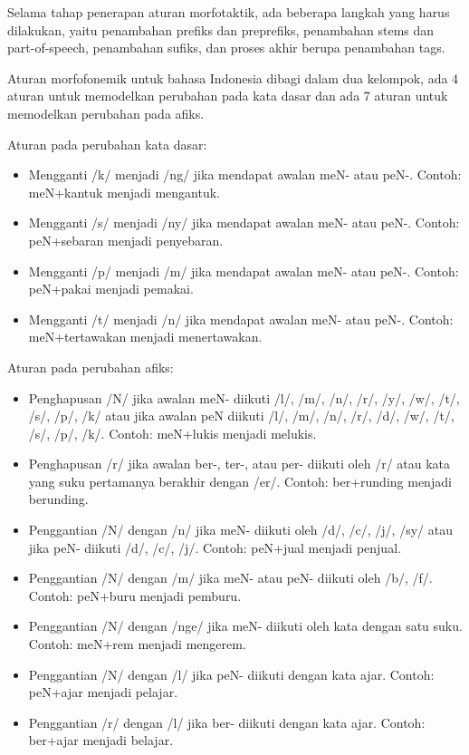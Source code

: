 Selama tahap penerapan aturan morfotaktik, ada beberapa langkah yang harus dilakukan, yaitu penambahan prefiks dan preprefiks, penambahan stems dan part-of-speech, penambahan sufiks, dan proses akhir berupa penambahan tags.

Aturan morfofonemik untuk bahasa Indonesia dibagi dalam dua kelompok, ada 4 aturan untuk memodelkan perubahan pada kata dasar dan ada 7 aturan untuk memodelkan perubahan pada afiks.

Aturan pada perubahan kata dasar:
	\begin{itemize}
		\item Mengganti /k/ menjadi /ng/ jika mendapat awalan meN- atau peN-.
Contoh: meN+kantuk menjadi mengantuk.
		\item Mengganti /s/ menjadi /ny/ jika mendapat awalan meN- atau peN-.
Contoh: peN+sebaran menjadi penyebaran.
		\item Mengganti /p/ menjadi /m/ jika mendapat awalan meN- atau peN-.
Contoh: peN+pakai menjadi pemakai.
		\item Mengganti /t/ menjadi /n/ jika mendapat awalan meN- atau peN-.
Contoh: meN+tertawakan menjadi menertawakan.
	\end{itemize}

Aturan pada perubahan afiks:
	\begin{itemize}
		\item Penghapusan /N/ jika awalan meN- diikuti /l/, /m/, /n/, /r/, /y/, /w/, /t/, /s/, /p/, /k/ atau jika awalan peN diikuti /l/, /m/, /n/, /r/, /d/, /w/, /t/, /s/, /p/, /k/. 
Contoh: meN+lukis menjadi melukis.
		\item Penghapusan /r/ jika awalan ber-, ter-, atau per- diikuti oleh /r/ atau kata yang suku pertamanya berakhir dengan /er/. 
Contoh: ber+runding menjadi berunding.
		\item Penggantian /N/ dengan /n/ jika meN- diikuti oleh /d/, /c/, /j/, /sy/ atau jika peN- diikuti /d/, /c/, /j/. 
Contoh: peN+jual menjadi penjual.
		\item Penggantian /N/ dengan /m/ jika meN- atau peN- diikuti oleh /b/, /f/. 
Contoh: peN+buru menjadi pemburu.
		\item Penggantian /N/ dengan /nge/ jika meN- diikuti oleh kata dengan satu suku. 
Contoh: meN+rem menjadi mengerem.
		\item Penggantian /N/ dengan /l/ jika peN- diikuti dengan kata ajar. 
Contoh: peN+ajar menjadi pelajar.
		\item Penggantian /r/ dengan /l/ jika ber- diikuti dengan kata ajar. 
Contoh: ber+ajar menjadi belajar.
	\end{itemize}

